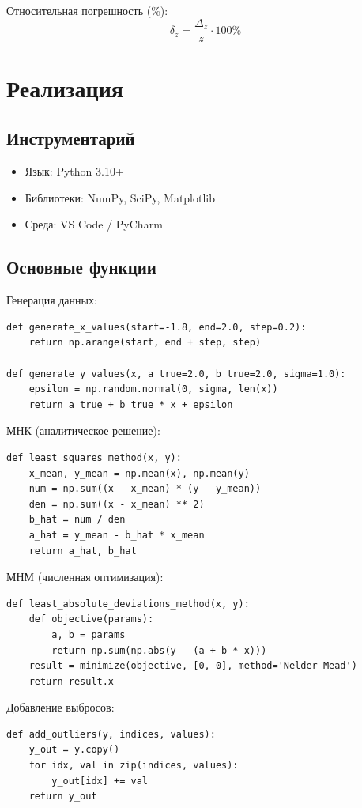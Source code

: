 \documentclass[12pt, a4paper]{article}
\begin{document}
Относительная погрешность (\%):
\begin{equation}
\delta_z = \frac{\Delta_z}{z} \cdot 100\%
\end{equation}

\section{Реализация}

\subsection{Инструментарий}
\begin{itemize}
    \item Язык: Python 3.10+
    \item Библиотеки: NumPy, SciPy, Matplotlib
    \item Среда: VS Code / PyCharm
\end{itemize}

\subsection{Основные функции}

Генерация данных:
\begin{lstlisting}
def generate_x_values(start=-1.8, end=2.0, step=0.2):
    return np.arange(start, end + step, step)

def generate_y_values(x, a_true=2.0, b_true=2.0, sigma=1.0):
    epsilon = np.random.normal(0, sigma, len(x))
    return a_true + b_true * x + epsilon
\end{lstlisting}

МНК (аналитическое решение):
\begin{lstlisting}
def least_squares_method(x, y):
    x_mean, y_mean = np.mean(x), np.mean(y)
    num = np.sum((x - x_mean) * (y - y_mean))
    den = np.sum((x - x_mean) ** 2)
    b_hat = num / den
    a_hat = y_mean - b_hat * x_mean
    return a_hat, b_hat
\end{lstlisting}

МНМ (численная оптимизация):
\begin{lstlisting}
def least_absolute_deviations_method(x, y):
    def objective(params):
        a, b = params
        return np.sum(np.abs(y - (a + b * x)))
    result = minimize(objective, [0, 0], method='Nelder-Mead')
    return result.x
\end{lstlisting}

Добавление выбросов:
\begin{lstlisting}
def add_outliers(y, indices, values):
    y_out = y.copy()
    for idx, val in zip(indices, values):
        y_out[idx] += val
    return y_out
\end{lstlisting}
\end{document}
